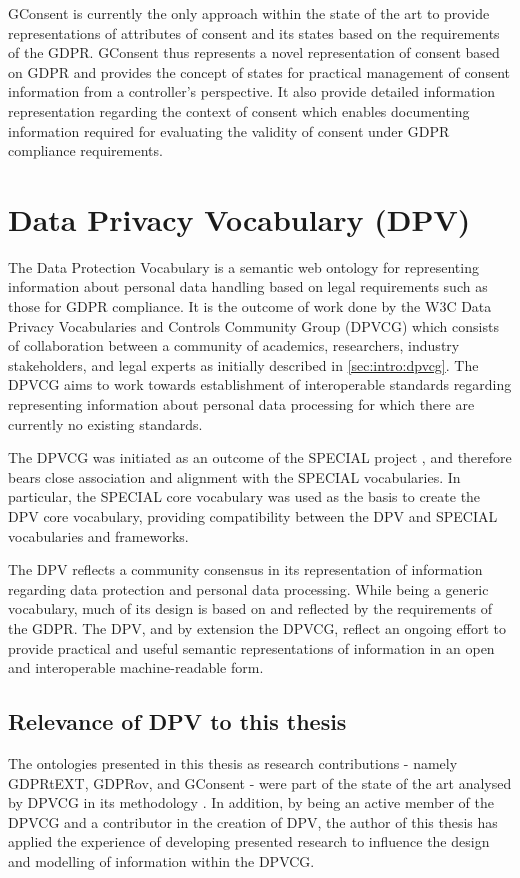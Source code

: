 GConsent is currently the only approach within the state of the art to provide representations of attributes of consent and its states based on the requirements of the GDPR.
GConsent thus represents a novel representation of consent based on GDPR and provides the concept of states for practical management of consent information from a controller's perspective. It also provide detailed information representation regarding the context of consent which enables documenting information required for evaluating the validity of consent under GDPR compliance requirements.

\section{Data Privacy Vocabulary (DPV)}\label{sec:voc:DPV}
The Data Protection Vocabulary \cite{pandit_creating_2019} is a semantic web ontology for representing information about personal data handling based on legal requirements such as those for GDPR compliance.
It is the outcome of work done by the W3C Data Privacy Vocabularies and Controls Community Group (DPVCG) which consists of collaboration between a community of academics, researchers, industry stakeholders, and legal experts as initially described in \autoref{sec:intro:dpvcg}.
The DPVCG aims to work towards establishment of interoperable standards regarding representing information about personal data processing for which there are currently no existing standards.

The DPVCG was initiated as an outcome of the SPECIAL project \cite{pandit_d6.5_2019}, and therefore bears close association and alignment with the SPECIAL vocabularies.
In particular, the SPECIAL core vocabulary was used as the basis to create the DPV core vocabulary, providing compatibility between the DPV and SPECIAL vocabularies and frameworks.

The DPV reflects a community consensus in its representation of information regarding data protection and personal data processing. While being a generic vocabulary, much of its design is based on and reflected by the requirements of the GDPR. The DPV, and by extension the DPVCG, reflect an ongoing effort to provide practical and useful semantic representations of information in an open and interoperable machine-readable form. 

\subsection{Relevance of DPV to this thesis}
The ontologies presented in this thesis as research contributions - namely GDPRtEXT, GDPRov, and GConsent - were part of the state of the art analysed by DPVCG in its methodology \cite{pandit_creating_2019}.
In addition, by being an active member of the DPVCG and a contributor in the creation of DPV, the author of this thesis has applied the experience of developing presented research to influence the design and modelling of information within the DPVCG.

